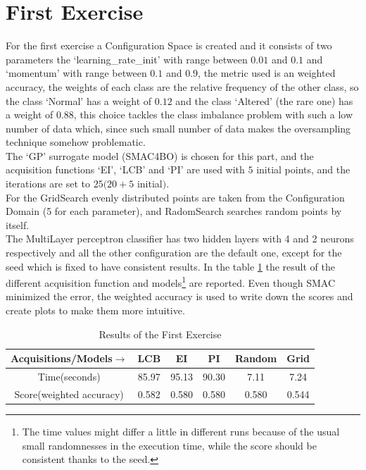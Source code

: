 \documentclass[12pt, onecolumn]{article}
\begin{document}
\section*{First Exercise}
For the first exercise a Configuration Space is created and it consists of two parameters the `learning\_rate\_init' with range between $0.01$ and $0.1$ and `momentum'  with range between $0.1$ and $0.9$, the metric used is an weighted accuracy, the weights of each class are the relative frequency of the other class, so the class `Normal' has a weight of $0.12$ and the class `Altered' (the rare one) has a weight of $0.88$, this choice tackles the class imbalance problem with such a low number of data which, since such small number of data makes the oversampling technique somehow problematic.\\
The `GP' surrogate model (SMAC4BO) is chosen for this part, and the acquisition functions `EI', `LCB' and `PI' are used with $5$ initial points, and the iterations are set to $25 (20 + 5$ initial$)$.\\
For the GridSearch evenly distributed points are taken from the Configuration Domain (5 for each parameter), and RadomSearch searches random points by itself.\\
The MultiLayer perceptron classifier has two hidden layers with 4 and 2 neurons respectively and all the other configuration are the default one, except for the seed which is fixed to have consistent results. 
In the table \ref{tab:Ex1_res} the result of the different acquisition function and models\footnote{The time values might differ a little in different runs because of the usual small randomnesses in the execution time, while the score should be consistent thanks to the seed.} are reported.
Even though SMAC minimized the error, the weighted accuracy is used to write down the scores and create plots to make them more intuitive.

\begin{table}[!h]
  \centering
  \begin{tabular}{ |c|c|c|c|c|c| } 
    \hline
    Acquisitions/Models$\to$ & LCB  & EI & PI & Random & Grid \\
    \hline
    Time(seconds) & 85.97 & 95.13 & 90.30 & 7.11 & 7.24\\
    \hline
    Score(weighted accuracy) & 0.582 & 0.580 & 0.580 & 0.580 & 0.544\\ 
    \hline
  \end{tabular}
  \caption{Results of the First Exercise}
  \label{tab:Ex1_res}
\end{table}
\end{document}
